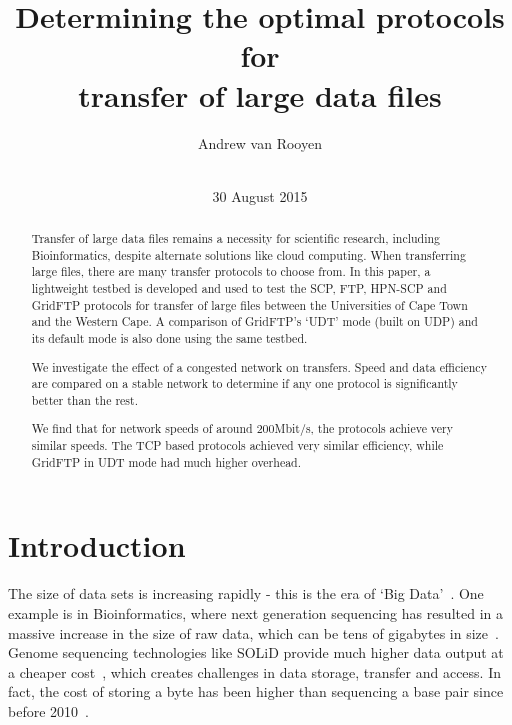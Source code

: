 \documentclass{sig-alternate-05-2015}
\begin{document}
\title{Determining the optimal protocols for\\transfer of large data files}

\author{
\alignauthor Andrew van Rooyen\\
\\
}

\date{30 August 2015}


\maketitle
\begin{abstract}
Transfer of large data files remains a necessity for scientific research, including Bioinformatics, despite alternate solutions like cloud computing. When transferring large files, there are many transfer protocols to choose from. In this paper, a lightweight testbed is developed and used to test the SCP, FTP, HPN-SCP and GridFTP protocols for transfer of large files between the Universities of Cape Town and the Western Cape.
A comparison of GridFTP's `UDT' mode (built on UDP) and its default mode is also done using the same testbed.

We investigate the effect of a congested network on transfers. Speed and data efficiency are compared on a stable network to determine if any one protocol is significantly better than the rest.

We find that for network speeds of around 200Mbit/s, the protocols achieve very similar speeds. The TCP based protocols achieved very similar efficiency, while GridFTP in UDT mode had much higher overhead.
\end{abstract}

\section{Introduction}
The size of data sets is increasing rapidly - this is the era of `Big Data'~\cite{manyika2011big}. One example is in Bioinformatics, where next generation sequencing has resulted in a massive increase in the size of raw data, which can be tens of gigabytes in size~\cite{deorowicz2011compression}. Genome sequencing technologies like SOLiD provide much higher data output at a cheaper cost~\cite{shendure2008next}, which creates challenges in data storage, transfer and access. In fact, the cost of storing a byte has been higher than sequencing a base pair since before 2010~\cite{baker2010next}.
\end{document}
